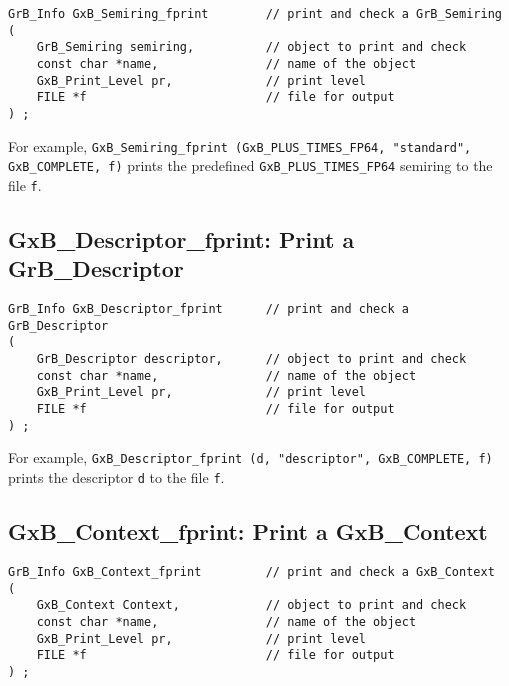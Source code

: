 \documentclass[12pt]{article}
\begin{document}
\begin{mdframed}[userdefinedwidth=6in]
{\footnotesize
\begin{verbatim}
GrB_Info GxB_Semiring_fprint        // print and check a GrB_Semiring
(
    GrB_Semiring semiring,          // object to print and check
    const char *name,               // name of the object
    GxB_Print_Level pr,             // print level
    FILE *f                         // file for output
) ;
\end{verbatim} } \end{mdframed}

For example,
\verb'GxB_Semiring_fprint (GxB_PLUS_TIMES_FP64, "standard",'
\verb'GxB_COMPLETE, f)'
prints the predefined \verb'GxB_PLUS_TIMES_FP64' semiring to the file \verb'f'.

\newpage
\subsection{{\sf GxB\_Descriptor\_fprint:} Print a {\sf GrB\_Descriptor}}

\begin{mdframed}[userdefinedwidth=6in]
{\footnotesize
\begin{verbatim}
GrB_Info GxB_Descriptor_fprint      // print and check a GrB_Descriptor
(
    GrB_Descriptor descriptor,      // object to print and check
    const char *name,               // name of the object
    GxB_Print_Level pr,             // print level
    FILE *f                         // file for output
) ;
\end{verbatim} } \end{mdframed}

For example,
\verb'GxB_Descriptor_fprint (d, "descriptor", GxB_COMPLETE, f)'
prints the descriptor \verb'd' to the file \verb'f'.

\subsection{{\sf GxB\_Context\_fprint:} Print a {\sf GxB\_Context}}
\label{context_print}

\begin{mdframed}[userdefinedwidth=6in]
{\footnotesize
\begin{verbatim}
GrB_Info GxB_Context_fprint         // print and check a GxB_Context
(
    GxB_Context Context,            // object to print and check
    const char *name,               // name of the object
    GxB_Print_Level pr,             // print level
    FILE *f                         // file for output
) ;
\end{verbatim} } \end{mdframed}
\end{document}
